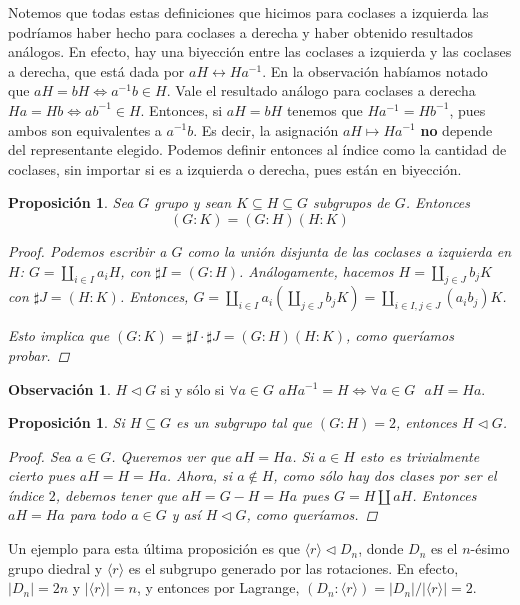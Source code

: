 \documentclass[12pt]{book}
\newtheorem{prop}[teo]{Proposición}
\theoremstyle{definition}
\newtheorem{obs}[teo]{Observación}
\begin{document}
Notemos que todas estas definiciones que hicimos para coclases a izquierda las podríamos haber hecho para coclases a derecha y haber obtenido resultados análogos. En efecto, hay una biyección entre las coclases a izquierda y las coclases a derecha, que está dada por $aH\longleftrightarrow Ha^{-1}$. En la observación habíamos notado que $aH=bH \Longleftrightarrow a^{-1}b\in H$. Vale el resultado análogo para coclases a derecha $Ha = Hb \Longleftrightarrow ab^{-1}\in H$. Entonces, si $aH = bH$ tenemos que $Ha^{-1} = Hb^{-1}$, pues ambos son equivalentes a $a^{-1}b$. Es decir, la asignación $aH \mapsto Ha^{-1}$ \textbf{no} depende del representante elegido. Podemos definir entonces al índice como la cantidad de coclases, sin importar si es a izquierda o derecha, pues están en biyección.

\begin{prop}
Sea $G$ grupo y sean $K\subseteq H\subseteq G$ subgrupos de $G$. Entonces $$(G:K) = (G:H)(H:K)$$
\begin{proof}
Podemos escribir a $G$ como la unión disjunta de las coclases a izquierda en $H$: $G = \displaystyle\coprod_{i\in I}a_iH$, con $\sharp I = (G:H)$. Análogamente, hacemos $H = \displaystyle\coprod_{j\in J}b_j K$ con $\sharp J = (H:K)$. Entonces, $G = \displaystyle\coprod_{i\in I}a_i \left( \displaystyle\coprod_{j\in J}b_j K\right) = \displaystyle\coprod_{i\in I, j\in J}(a_ib_j)K$. 

Esto implica que $(G:K) = \sharp I\cdot \sharp J = (G:H)(H:K)$, como queríamos probar.
\end{proof}
\end{prop}

\begin{obs}
$H\triangleleft G$ si y sólo si $\forall a\in G$ $aHa^{-1}= H \Longleftrightarrow \forall a\in G \text{ } aH=Ha$.
\end{obs}

\begin{prop}
Si $H\subseteq G$ es un subgrupo tal que $(G:H)=2$, entonces $H\triangleleft G$.
\begin{proof}
Sea $a\in G$. Queremos ver que $aH=Ha$. Si $a\in H$ esto es trivialmente cierto pues $aH=H=Ha$. Ahora, si $a\notin H$, como sólo hay dos clases por ser el índice $2$, debemos tener que $aH=G-H = Ha$ pues $G = H\coprod aH$. Entonces $aH=Ha$ para todo $a\in G$ y así $H\triangleleft G$, como queríamos.
\end{proof}
\end{prop}

Un ejemplo para esta última proposición es que $\langle r\rangle \triangleleft D_n$, donde $D_n$ es el $n$-ésimo grupo diedral y $\langle r\rangle$ es el subgrupo generado por las rotaciones. En efecto, $|D_n|=2n$ y $|\langle r\rangle|=n$, y entonces por Lagrange, $(D_n : \langle r\rangle) = |D_n|/|\langle r\rangle| = 2$.
\end{document}
